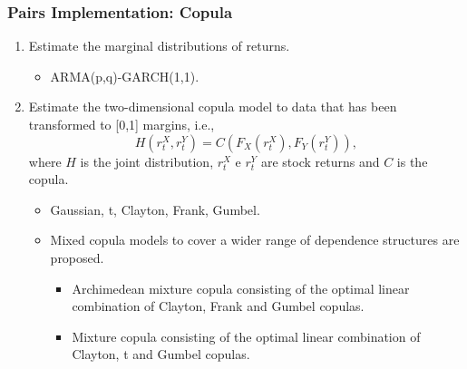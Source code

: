 \documentclass[pdf,9pt,xcolor=dvipsnames,hide notes]{beamer}
\begin{document}
	
\begin{frame}[label=frame4h]
	\frametitle{Pairs Implementation: Copula}
	
	
	\begin{enumerate}[(1)]
		\justifying
		
		\item  Estimate the marginal distributions of returns.
		\vspace{0.3cm}
		
		
		\begin{itemize}	
			\item ARMA(p,q)-GARCH(1,1).
		\end{itemize}
		
		\vspace{0.3cm}
		
		\pause
		\item Estimate the two-dimensional copula model to data that has been transformed to [0,1] margins, i.e.,
		\[
		H\left( r_{t}^{X},r_{t}^{Y}\right) =C\left(F_{X}\left( r_{t}^{X}\right)
		,F_{Y}\left( r_{t}^{Y}\right) \right) , 
		\]%
		where $H$ is the joint distribution, $r_{t}^{X}$ e $r_{t}^{Y}$ are stock
		returns and $C$ is the copula.
		
		\vspace{0.3cm}
		
		\pause
		
		\begin{itemize}	
			\item Gaussian, t, Clayton, Frank, Gumbel.
			
			\pause
			\vspace{0.3cm}
						
			\item Mixed copula models to cover a wider range of dependence structures are
			proposed.
			
			\begin{itemize}
				\item Archimedean mixture copula consisting of the optimal linear combination of Clayton, Frank and Gumbel copulas.
				\item Mixture copula consisting of the optimal linear combination of Clayton, t and Gumbel copulas.
			\end{itemize}
			
			
		\end{itemize}
		
		\end{enumerate}
	\end{frame}
\end{document}
